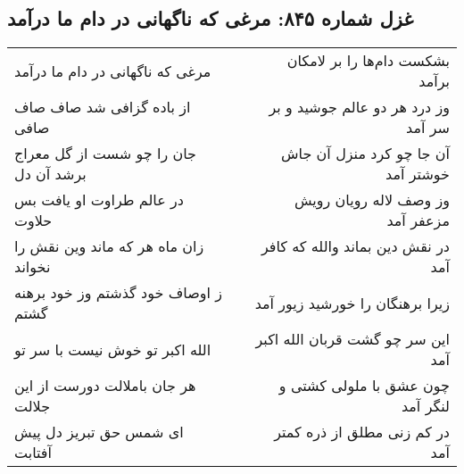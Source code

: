 \begin{center}
\section*{غزل شماره ۸۴۵: مرغی که ناگهانی در دام ما درآمد}
\label{sec:0845}
\begin{longtable}{l p{0.5cm} r}
مرغی که ناگهانی در دام ما درآمد
&&
بشکست دام‌ها را بر لامکان برآمد
\\
از باده گزافی شد صاف صاف صافی
&&
وز درد هر دو عالم جوشید و بر سر آمد
\\
جان را چو شست از گل معراج برشد آن دل
&&
آن جا چو کرد منزل آن جاش خوشتر آمد
\\
در عالم طراوت او یافت بس حلاوت
&&
وز وصف لاله رویان رویش مزعفر آمد
\\
زان ماه هر که ماند وین نقش را نخواند
&&
در نقش دین بماند والله که کافر آمد
\\
ز اوصاف خود گذشتم وز خود برهنه گشتم
&&
زیرا برهنگان را خورشید زیور آمد
\\
الله اکبر تو خوش نیست با سر تو
&&
این سر چو گشت قربان الله اکبر آمد
\\
هر جان باملالت دورست از این جلالت
&&
چون عشق با ملولی کشتی و لنگر آمد
\\
ای شمس حق تبریز دل پیش آفتابت
&&
در کم زنی مطلق از ذره کمتر آمد
\\
\end{longtable}
\end{center}
